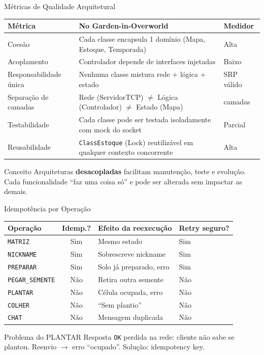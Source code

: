 \documentclass[aspectratio=169]{beamer}
\begin{document}
\begin{frame}[shrink=10]{M\'etricas de Qualidade Arquitetural}
  \footnotesize
  \begin{tabular}{>{\raggedright\arraybackslash}p{3.5cm}>{\raggedright\arraybackslash}p{4cm}>{\raggedright\arraybackslash}p{3.5cm}}
    \toprule
    \textbf{M\'etrica} & \textbf{No Garden-in-Overworld} & \textbf{Medidor} \\
    \midrule
    Coes\~ao & Cada classe encapsula 1 dom\'inio (Mapa, Estoque, Temporada) & Alta \\
    Acoplamento & Controlador depende de interfaces injetadas & Baixo \\
    Responsabilidade \'unica & Nenhuma classe mistura rede + l\'ogica + estado & SRP v\'alido \\
    Separa\c{c}\~ao de camadas & Rede (ServidorTCP) $\neq$ L\'ogica (Controlador) $\neq$ Estado (Mapa) & 3 camadas \\
    Testabilidade & Cada classe pode ser testada isoladamente com mock do socket & Parcial \\
    Reusabilidade & \texttt{ClassEstoque} (Lock) reutiliz\'avel em qualquer contexto concorrente & Alta \\
    \bottomrule
  \end{tabular}
  \vfill
  \begin{block}{Conceito}
    \footnotesize
    Arquiteturas \textbf{desacopladas} facilitam manuten\c{c}\~ao, teste e evolu\c{c}\~ao. Cada funcionalidade ``faz uma coisa s\'o'' e pode ser alterada sem impactar as demais.
  \end{block}
\end{frame}

\begin{frame}{Idempot\^encia por Opera\c{c}\~ao}
  \footnotesize
  \begin{tabular}{>{\raggedright\arraybackslash}p{3cm}c>{\raggedright\arraybackslash}p{3cm}>{\raggedright\arraybackslash}p{3cm}}
    \toprule
    \textbf{Opera\c{c}\~ao} & \textbf{Idemp.?} & \textbf{Efeito da reexecu\c{c}\~ao} & \textbf{Retry seguro?} \\
    \midrule
    \texttt{MATRIZ} & Sim & Mesmo estado & Sim \\
    \texttt{NICKNAME} & Sim & Sobrescreve nickname & Sim \\
    \texttt{PREPARAR} & Sim & Solo j\'a preparado, erro & Sim \\
    \texttt{PEGAR\_SEMENTE} & N\~ao & Retira outra semente & N\~ao \\
    \texttt{PLANTAR} & N\~ao & C\'elula ocupada, erro & N\~ao \\
    \texttt{COLHER} & N\~ao & ``Sem plantio'' & N\~ao \\
    \texttt{CHAT} & N\~ao & Mensagem duplicada & N\~ao \\
    \bottomrule
  \end{tabular}
  \begin{alertblock}{Problema do PLANTAR}
    Resposta \texttt{OK} perdida na rede: cliente n\~ao sabe se plantou. Reenvio $\rightarrow$ erro ``ocupado''. Solu\c{c}\~ao: idempotency key.
  \end{alertblock}
\end{frame}
\end{document}
